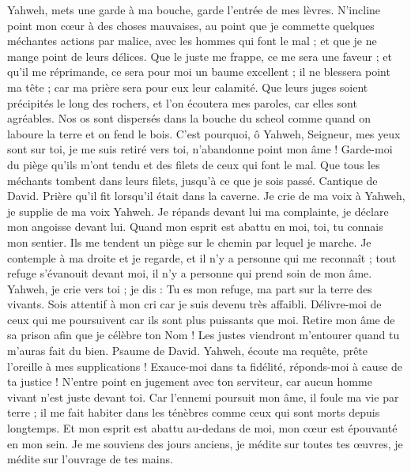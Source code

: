 \begin{multicols}{2}
Yahweh, mets une garde à ma bouche, garde l'entrée de mes lèvres.
N'incline point mon cœur à des choses mauvaises, au point que je commette quelques méchantes actions par malice, avec les hommes qui font le mal ; et que je ne mange point de leurs délices.
Que le juste me frappe, ce me sera une faveur ; et qu'il me réprimande, ce sera pour moi un baume excellent ; il ne blessera point ma tête ; car ma prière sera pour eux leur calamité.
Que leurs juges soient précipités le long des rochers, et l’on écoutera mes paroles, car elles sont agréables.
Nos os sont dispersés dans la bouche du scheol comme quand on laboure la terre et on fend le bois.
C'est pourquoi, ô Yahweh, Seigneur, mes yeux sont sur toi, je me suis retiré vers toi, n'abandonne point mon âme !
Garde-moi du piège qu'ils m'ont tendu et des filets de ceux qui font le mal.
Que tous les méchants tombent dans leurs filets, jusqu’à ce que je sois passé.
\VerseOne{}Cantique de David. Prière qu'il fit lorsqu'il était dans la caverne.
Je crie de ma voix à Yahweh, je supplie de ma voix Yahweh.
Je répands devant lui ma complainte, je déclare mon angoisse devant lui.
Quand mon esprit est abattu en moi, toi, tu connais mon sentier. Ils me tendent un piège sur le chemin par lequel je marche.
Je contemple à ma droite et je regarde, et il n’y a personne qui me reconnaît ; tout refuge s’évanouit devant moi, il n'y a personne qui prend soin de mon âme.
Yahweh, je crie vers toi ; je dis : Tu es mon refuge, ma part sur la terre des vivants.
Sois attentif à mon cri car je suis devenu très affaibli. Délivre-moi de ceux qui me poursuivent car ils sont plus puissants que moi.
Retire mon âme de sa prison afin que je célèbre ton Nom ! Les justes viendront m’entourer quand tu m'auras fait du bien.
\VerseOne{}Psaume de David. Yahweh, écoute ma requête, prête l'oreille à mes supplications ! Exauce-moi dans ta fidélité, réponds-moi à cause de ta justice !
N'entre point en jugement avec ton serviteur, car aucun homme vivant n’est juste devant toi.
Car l'ennemi poursuit mon âme, il foule ma vie par terre ; il me fait habiter dans les ténèbres comme ceux qui sont morts depuis longtemps.
Et mon esprit est abattu au-dedans de moi, mon cœur est épouvanté en mon sein.
Je me souviens des jours anciens, je médite sur toutes tes œuvres, je médite sur l’ouvrage de tes mains.

\end{multicols}
